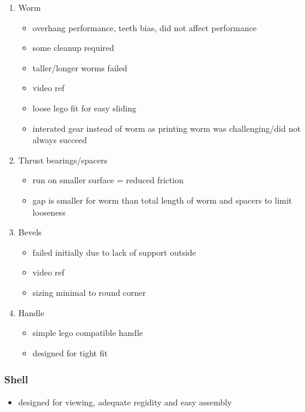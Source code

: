 \documentclass[11pt]{article}
\begin{document}
\begin{enumerate}
\item Worm
\label{sec:org36dcff0}
\begin{itemize}
\item overhang performance, teeth bias, did not affect performance
\item some cleanup required
\item taller/longer worms failed
\item video ref
\item loose lego fit for easy sliding
\item interated gear instead of worm as printing worm was challenging/did not always succeed
\end{itemize}

\item Thrust bearings/spacers
\label{sec:orgcd6b2c9}
\begin{itemize}
\item run on smaller surface = reduced friction
\item gap is smaller for worm than total length of worm and spacers to limit looseness
\end{itemize}

\item Bevels
\label{sec:orge8ee5af}
\begin{itemize}
\item failed initially due to lack of support outside
\item video ref
\item sizing minimal to round corner
\end{itemize}

\item Handle
\label{sec:orgc1eb78f}
\begin{itemize}
\item simple lego compatible handle
\item designed for tight fit
\end{itemize}
\end{enumerate}

\subsubsection{Shell}
\label{sec:org187371a}
\begin{itemize}
\item designed for viewing, adequate regidity and easy assembly
\end{itemize}
\end{document}
